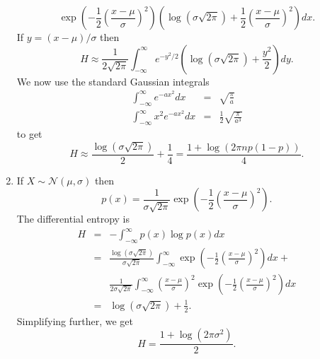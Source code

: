 \documentclass{article}
\numberwithin{equation}{section}
\theoremstyle{plain}
\numberwithin{thm}{section}
\theoremstyle{plain}
\numberwithin{prop}{section}
\theoremstyle{definition}
\numberwithin{defn}{section}
\theoremstyle{remark}
\begin{document}
\begin{enumerate}
\begin{equation}
\exp\left(-\frac{1}{2}\left(\frac{x - \mu}{\sigma}\right)^2\right)
\left(\log (\sigma\sqrt{2\pi}) + 
\frac{1}{2}\left(\frac{x - \mu}{\sigma}\right)^2\right)dx.
\end{equation}
If $y = (x - \mu)/\sigma$ then
\begin{equation}\label{s2e14}
H \approx \frac{1}{2\sqrt{2\pi}}\int_{-\infty}^\infty e^{-y^2/2}
\left(\log(\sigma\sqrt{2\pi}) + \frac{y^2}{2}\right)dy.
\end{equation}
We now use the standard Gaussian integrals
\begin{eqnarray}
\int_{-\infty}^\infty e^{-ax^2}dx &=& \sqrt{\frac{\pi}{a}} \label{s2e15} \\
\int_{-\infty}^\infty x^2e^{-ax^2}dx &=& \frac{1}{2}\sqrt{\frac{\pi}{a^3}}
\label{s2e16}
\end{eqnarray}
to get
\begin{equation}\label{s2e17}
H \approx \frac{\log(\sigma\sqrt{2\pi})}{2} + \frac{1}{4} = 
\frac{1 + \log (2\pi np(1-p))}{4}.
\end{equation}
\item If $X \sim \mathcal{N}(\mu,\sigma)$ then
\begin{equation}\label{s2e18}
p(x) = \frac{1}{\sigma\sqrt{2\pi}}
\exp\left(-\frac{1}{2}\left(\frac{x - \mu}{\sigma}\right)^2\right).
\end{equation}
The differential entropy is
\begin{eqnarray*}
H &=& -\int_{-\infty}^\infty p(x)\log p(x)dx \\
 &=& \frac{\log(\sigma\sqrt{2\pi})}{\sigma\sqrt{2\pi}}\int_{-\infty}^\infty
\exp\left(-\frac{1}{2}\left(\frac{x - \mu}{\sigma}\right)^2\right)dx + \\
 & & \frac{1}{2\sigma\sqrt{2\pi}}
 \int_{-\infty}^\infty\left(\frac{x - \mu}{\sigma}\right)^2
\exp\left(-\frac{1}{2}\left(\frac{x - \mu}{\sigma}\right)^2\right)dx \\
 &=& \log(\sigma\sqrt{2\pi}) + \frac{1}{2}.
\end{eqnarray*}
Simplifying further, we get
\begin{equation}\label{s2e19}
H = \frac{1 + \log(2\pi\sigma^2)}{2}.
\end{equation}
\end{enumerate}
\end{document}
